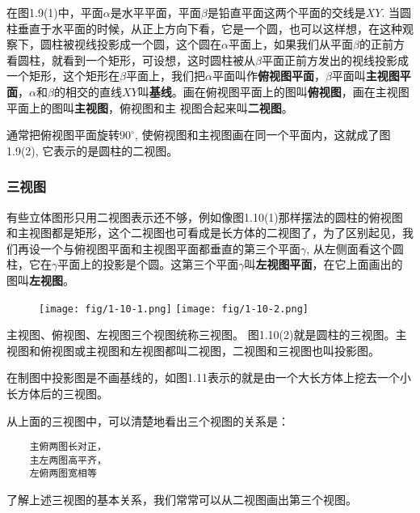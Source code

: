 在图1.9(1)中，平面$\alpha$是水平平面，平面$\beta$是铅直平面这两个平面的交线是$XY$. 当圆柱垂直于水平面的时候，从正上方向下看，它是一个圆，也可以这样想，在这种观察下，圆柱被视线投影成一个圆，这个圆在$\alpha$平面上，如果我们从平面$\beta$的正前方看圆柱，就看到一个矩形，可设想，这时圆柱被从$\beta$平面正前方发出的视线投影成一个矩形，这个矩形在$\beta$平面上，我们把$\alpha$平面叫作\textbf{俯视图平面}，$\beta$平面叫\textbf{主视图平面}，$\alpha$和$\beta$的相交的直线$XY$叫\textbf{基线}。画在俯视图平面上的图叫\textbf{俯视图}，画在主视图平面上的图叫\textbf{主视图}，俯视图和主
视图合起来叫\textbf{二视图}。

通常把俯视图平面旋转$90^{\circ}$, 使俯视图和主视图画在同一个平面内，这就成了图1.9(2), 它表示的是圆柱的二视图。

\subsubsection{三视图}

有些立体图形只用二视图表示还不够，例如像图1.10(1)那样摆法的圆柱的俯视图和主视图都是矩形，这个二视图也可看成是长方体的二视图了，为了区别起见，我们再设一个与俯视图平面和主视图平面都垂直的第三个平面$\gamma$, 从左侧面看这个圆柱，它在$\gamma$平面上的投影是个圆。这第三个平面$\gamma$叫\textbf{左视图平面}，在它上面画出的图叫\textbf{左视图}。

\begin{figure}[htp]
    \centering
\texttt{[image: fig/1-10-1.png]}
    \texttt{[image: fig/1-10-2.png]}
    \caption{}
    \end{figure}


主视图、俯视图、左视图三个视图统称三视图。
图1.10(2)就是圆柱的三视图。主视图和俯视图或主视图和左视图都叫二视图，二视图和三视图也叫投影图。

在制图中投影图是不画基线的，如图1.11表示的就是由一个大长方体上挖去一个小长方体后的三视图。

从上面的三视图中，可以清楚地看出三个视图的关系是：

\begin{verbatim}
    主俯两图长对正，
    主左两图高平齐，
    左俯两图宽相等
\end{verbatim}

了解上述三视图的基本关系，我们常常可以从二视图画出第三个视图。


